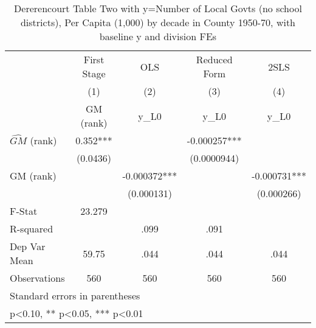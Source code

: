 \begin{table}[htbp]\centering
\def\sym#1{\ifmmode^{#1}\else\(^{#1}\)\fi}
\caption{Dererencourt Table Two with y=Number of Local Govts (no school districts), Per Capita (1,000) by decade in County 1950-70, with baseline y and division FEs}
\begin{tabular}{l*{4}{c}}
\toprule
                    & First Stage   &         OLS   &Reduced Form   &        2SLS   \\
                    &\multicolumn{1}{c}{(1)}&\multicolumn{1}{c}{(2)}&\multicolumn{1}{c}{(3)}&\multicolumn{1}{c}{(4)}\\
                    &\multicolumn{1}{c}{GM  (rank)}&\multicolumn{1}{c}{y\_L0}&\multicolumn{1}{c}{y\_L0}&\multicolumn{1}{c}{y\_L0}\\
\midrule
$\hat{GM}$ (rank)   &       0.352***&               &   -0.000257***&               \\
                    &    (0.0436)   &               & (0.0000944)   &               \\
\addlinespace
GM  (rank)          &               &   -0.000372***&               &   -0.000731***\\
                    &               &  (0.000131)   &               &  (0.000266)   \\
\midrule
F-Stat              &      23.279   &               &               &               \\
R-squared           &               &        .099   &        .091   &               \\
Dep Var Mean        &       59.75   &        .044   &        .044   &        .044   \\
Observations        &         560   &         560   &         560   &         560   \\
\bottomrule
\multicolumn{5}{l}{\footnotesize Standard errors in parentheses}\\
\multicolumn{5}{l}{\footnotesize * p<0.10, ** p<0.05, *** p<0.01}\\
\end{tabular}
\end{table}
